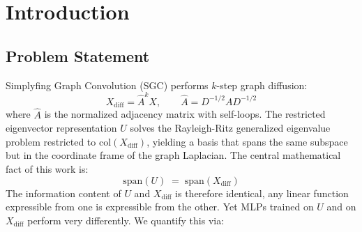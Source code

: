 \documentclass[11pt]{article}
\begin{document}
\begin{abstract}
\textbf{Representation, not optimization.}
A logistic regression classifier on $U$ matches the 3-layer MLP at most 10pp above a linear classifier on
all 9 datasets.  The MLP's nonlinearity adds almost nothing beyond a linear model.
Part~A is therefore a \emph{representation problem}: $U$-space is intrinsically harder
to classify than $X_{\mathrm{diff}}$-space for any classifier, not merely for
gradient-based optimization.

\textbf{Subspace preservation.}  D-orthonormality error $<10^{-9}$ and mean canonical
correlation $>0.935$ across all 81 dataset-$k$ combinations confirm that the
Rayleigh-Ritz projection is mathematically exact: variance structure destruction,
not information loss, drives Part~A.

\textbf{Recovery.}  Spectral reweighting ($\alpha{=}-1$) recovers 41--47pp on
monotonic datasets (Cora, CiteSeer, Coauthor-CS) by reintroducing eigenvalue
weighting suppressed by D-orthonormalization.  The $\alpha$ sensitivity range
across the sweep (51pp for Cora, $<1$pp for Amazon-Computers) is itself a
diagnostic of whether class signal is frequency-aligned.  Recovery is not universal:
on crossover datasets where signal is dispersed across all frequency components,
no monotone reweighting has leverage.
\end{abstract}

\clearpage

\section{Introduction}
\label{sec:intro}

\subsection{Problem Statement}

Simplyfing Graph Convolution (SGC) performs $k$-step graph diffusion:
\[
X_{\text{diff}} = \hat{A}^k X, \qquad \hat{A} = D^{-1/2}AD^{-1/2}
\]
where $\hat{A}$ is the normalized adjacency matrix with self-loops.
The restricted eigenvector representation $U$ solves the Rayleigh-Ritz generalized
eigenvalue problem restricted to $\mathrm{col}(X_{\mathrm{diff}})$, yielding a basis that
spans the same subspace but in the coordinate frame of the graph Laplacian.
The central mathematical fact of this work is:
\begin{equation}
  \boxed{\mathrm{span}(U) \;=\; \mathrm{span}(X_{\mathrm{diff}})}
  \label{eq:span_invariance}
\end{equation}
The information content of $U$ and $X_{\mathrm{diff}}$ is therefore identical,
any linear function expressible from one is expressible from the other.
Yet MLPs trained on $U$ and on $X_{\mathrm{diff}}$ perform very differently.
We quantify this via:
\end{document}
